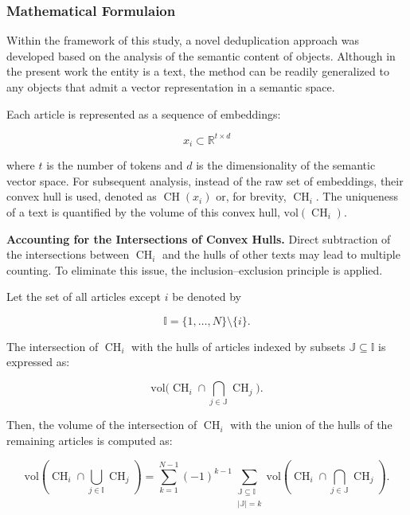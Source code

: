 \subsubsection{Mathematical Formulaion}
\sloppy  %

Within the framework of this study, a novel deduplication approach was developed based on the analysis of the semantic content of objects.
Although in the present work the entity is a text, the method can be readily generalized to any objects that admit a vector representation
in a semantic space.

Each article is represented as a sequence of embeddings:

\begin{equation}
    x_i \subset \mathbb{R}^{t\times d}
\end{equation}

where $t$ is the number of tokens and $d$ is the dimensionality of the semantic vector space. For subsequent analysis, instead of the raw set of embeddings,
their convex hull is used, denoted as $\operatorname{CH}(x_i)$ or, for brevity, $\operatorname{CH}_i$. The uniqueness of a text is quantified by the volume
of this convex hull, $\mathrm{vol}(\operatorname{CH}_i)$.

\textbf{Accounting for the Intersections of Convex Hulls.} Direct subtraction of the intersections between $\operatorname{CH}_i$ and the hulls of other
texts may lead to multiple counting. To eliminate this issue, the inclusion--exclusion principle is applied.

Let the set of all articles except $i$ be denoted by

\begin{equation}
    \mathbb{I} = \{1, \ldots, N\} \setminus \{i\}.
\end{equation}

The intersection of $\operatorname{CH}_i$ with the hulls of articles indexed by subsets $\mathbb{J} \subseteq \mathbb{I}$ is expressed as:

\begin{equation}
    \mathrm{vol}\Big(\operatorname{CH}_i \cap \bigcap_{j \in \mathbb{J}}\operatorname{CH}_j\Big).
\end{equation}

Then, the volume of the intersection of $\operatorname{CH}_i$ with the union of the hulls of the remaining articles is computed as:

\begin{equation}\label{eq:inclusion-exclusion_substituting}
    \mathrm{vol}\left(\operatorname{CH}_i \cap \bigcup_{j \in \mathbb{I}}\operatorname{CH}_j\right)
    =
    \sum_{k=1}^{N-1} (-1)^{k-1} \sum_{\substack{\mathbb{J} \subseteq \mathbb{I} \\ |\mathbb{J}| = k}}
    \mathrm{vol}\left(\operatorname{CH}_i \cap \bigcap_{j \in \mathbb{J}}\operatorname{CH}_j\right).
\end{equation}

